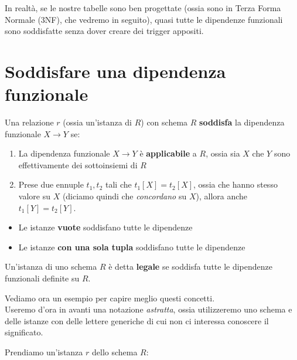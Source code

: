 \documentclass[11pt, a4paper, titlepage, oneside]{scrbook}
\begin{document}
In realtà, se le nostre tabelle sono ben progettate (ossia sono in Terza Forma Normale (3NF), che vedremo in seguito), quasi tutte le dipendenze funzionali sono soddisfatte senza dover creare dei trigger appositi.

\section{Soddisfare una dipendenza funzionale}

\begin{Definizione}
\label{def-soddisfare-dipendenza}
Una relazione $r$ (ossia un'istanza di $R$) con schema $R$ \textbf{soddisfa} la dipendenza funzionale $X \longrightarrow Y$ se:
\begin{enumerate}
    \item La dipendenza funzionale $X \longrightarrow Y$ è \textbf{applicabile} a $R$, ossia sia $X$ che $Y$ sono effettivamente dei sottoinsiemi di $R$
    \item Prese due ennuple $t_1,t_2$ tali che $t_1[X] = t_2[X]$, ossia che hanno stesso valore su $X$ (diciamo quindi che \textit{concordano} su $X$), allora anche $t_1[Y] = t_2[Y]$.
\end{enumerate}
\end{Definizione}

\begin{Osservazione}[]
\label{oss-soddisfare-dipendenza}
\begin{itemize}
    \item Le istanze \textbf{vuote} soddisfano tutte le dipendenze
    \item Le istanze \textbf{con una sola tupla} soddisfano tutte le dipendenze
\end{itemize}
\end{Osservazione}

\begin{Definizione}
\label{def-istanza-legale}
Un'istanza di uno schema $R$ è detta \textbf{legale} se soddisfa tutte le dipendenze funzionali definite su $R$.
\end{Definizione}

Vediamo ora un esempio per capire meglio questi concetti. \\
\NB Useremo d'ora in avanti una notazione \textit{astratta}, ossia utilizzeremo uno schema e delle istanze con delle lettere generiche di cui non ci interessa conoscere il significato.

Prendiamo un'istanza $r$ dello schema $R$:
\end{document}

